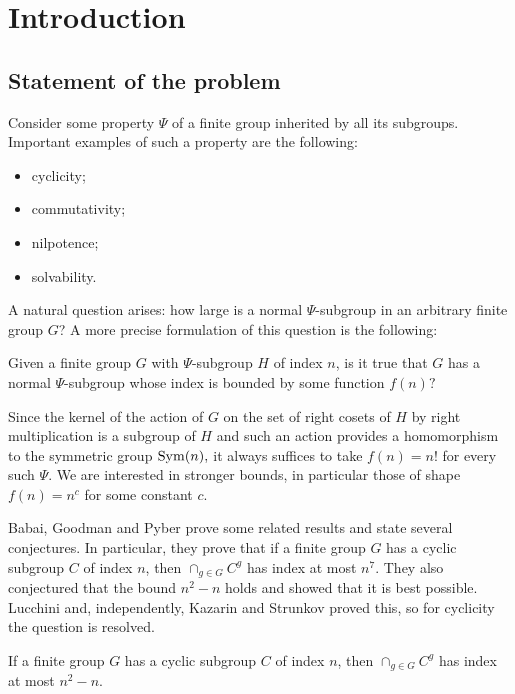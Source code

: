 \chapter{Introduction}

\section{Statement of the problem}

Consider some property $\Psi$ of a finite group inherited by all its subgroups.  Important examples of  such a property are  the following:
\begin{itemize}
\item cyclicity; 
\item commutativity; 
\item nilpotence; 
\item solvability.
\end{itemize}
A natural question arises: how large is a normal $\Psi$-subgroup in an arbitrary finite group $G$? A more precise formulation of this question is the following:

\begin{Que}\label{que1}
Given a finite group $G$ with $\Psi$-subgroup $H$ of index $n$, is it true that $G$ has a normal $\Psi$-subgroup whose index is bounded by some function $f(n)?$
\end{Que}

Since the kernel of the action of $G$ on the set of right cosets of $H$ by right multiplication is a subgroup of $H$ and such an action provides a homomorphism to the symmetric group $\mathrm{Sym}(n),$   it always suffices to take $f(n)=n!$ for every such $\Psi$. We are interested in  stronger bounds, in particular those of shape $f(n)=n^c$ for some constant $c.$



Babai, Goodman and Pyber \cite{bab} prove some related results and state several conjectures.
In particular, they prove that
if a finite group $G$ has a cyclic subgroup ${C}$ of index $n$, then $ \cap_{g \in G} {{C}}^g$ has index at most $n^7.$
They also conjectured that the bound $n^2-n$ holds  and showed that it is best possible. Lucchini \cite{luccini} and, independently,  Kazarin and  Strunkov \cite{kaz} proved this, so for cyclicity the question is resolved. 

\begin{Th}
If a finite group $G$ has a cyclic subgroup ${C}$ of index $n$, then $ \cap_{g \in G} {{C}}^g$ has index at most $n^2-n.$
\end{Th}

